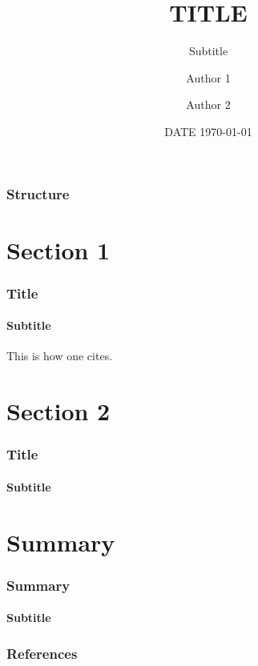 \documentclass{beamer}
\title{TITLE}
\subtitle{Subtitle}
\author{Author 1 \and Author 2}
\date{DATE \today}
\begin{document}
\begin{frame}[plain]
  \titlepage
\end{frame}

\begin{frame}
  \frametitle{Structure}
  \tableofcontents%
\end{frame}

\section{Section 1}
\begin{frame}
  \frametitle{Title}
  \framesubtitle{Subtitle}
  This is how one cites. 

\end{frame}

\section{Section 2}
\begin{frame}
  \frametitle{Title}
  \framesubtitle{Subtitle}
\end{frame}

\section{Summary}
\begin{frame}
  \frametitle{Summary}
  \framesubtitle{Subtitle}
\end{frame}

\begin{frame}[allowframebreaks]
  \frametitle{References}
  \printbibliography
\end{frame}
\end{document}

